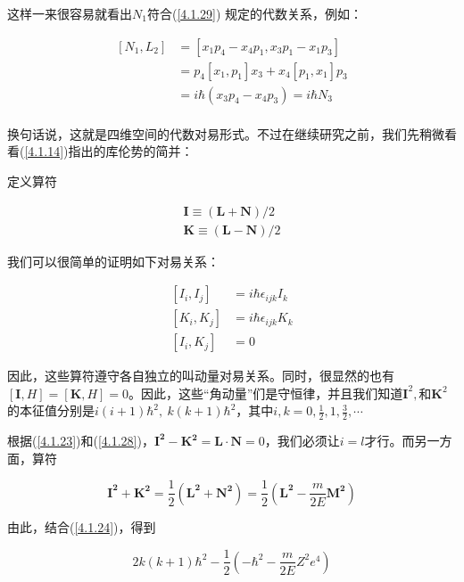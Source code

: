 \documentclass[UTF8,twoside]{ctexart}
\begin{document}
\noindent 这样一来很容易就看出$N_1$符合(\ref{4.1.29}) 规定的代数关系，例如：

\begin{equation}
\begin{split}
\left[N_1, L_2\right] &= \left[x_1p_4 - x_4p_1, x_3p_1 - x_1p_3\right]\\
&=p_4\left[x_1, p_1\right]x_3 + x_4\left[p_1, x_1\right]p_3\\
&=i\hbar\left(x_3p_4 - x_4p_3\right) = i\hbar N_3\\
\end{split}
\end{equation}

\noindent 换句话说，这就是四维空间的代数对易形式。不过在继续研究之前，我们先稍微看看(\ref{4.1.14})指出的库伦势的简并：

定义算符

\begin{align}
\bm{I} \equiv \bm{(L + N)}/2  \\
\bm{K} \equiv \bm{(L - N)}/2
\end{align}

\noindent 我们可以很简单的证明如下对易关系：

\begin{subequations}  \label{4.1.34}
\begin{align}
\left[I_i, I_j\right] &= i\hbar\epsilon_{ijk}I_k\\
\left[K_i, K_j\right] &= i\hbar\epsilon_{ijk}K_k\\
\left[I_i, K_j\right] &= 0
\end{align}
\end{subequations}

\noindent 因此，这些算符遵守各自独立的叫动量对易关系。同时，很显然的也有$\left[\bm{I}, H\right] = \left[\bm{K}, H\right] = 0$。因此，这些“角动量”们是守恒律，并且我们知道$\bm{I}^2, \text{和}\bm{K}^2$的本征值分别是$i(i+1)\hbar^2,\ k(k+1)\hbar^2$，其中$i, k = 0, \frac{1}{2}, 1, \frac{3}{2}, \cdots$

根据(\ref{4.1.23})和(\ref{4.1.28})，$\bm{I^2 - K^2} = \bm{L \cdot N} = 0$，我们必须让$i = l$才行。而另一方面，算符

\begin{equation}
\bm{I^2 + K^2} = \frac{1}{2}\left(\bm{L^2 + N^2}\right) = \frac{1}{2}\left(\bm{L^2} - \frac{m}{2E}\bm{M^2}\right)
\end{equation}

\noindent 由此，结合(\ref{4.1.24})，得到

\begin{equation}
2k(k+1)\hbar^2 - \frac{1}{2}\left(-\hbar^2 - \frac{m}{2E}Z^2e^4\right)
\end{equation}
\end{document}
